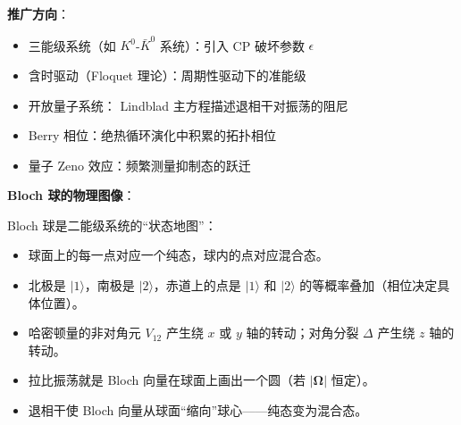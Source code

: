\begin{insightbox}[物理图像与模型关联]
\textbf{推广方向}：
\begin{itemize}[nosep]
    \item 三能级系统（如 $K^0$-$\bar{K}^0$ 系统）：引入 CP 破坏参数 $\epsilon$
    \item 含时驱动（Floquet 理论）：周期性驱动下的准能级
    \item 开放量子系统： Lindblad 主方程描述退相干对振荡的阻尼
    \item Berry 相位：绝热循环演化中积累的拓扑相位
    \item 量子 Zeno 效应：频繁测量抑制态的跃迁
\end{itemize}

\textbf{Bloch 球的物理图像}：

Bloch 球是二能级系统的``状态地图''：
\begin{itemize}[nosep]
    \item 球面上的每一点对应一个纯态，球内的点对应混合态。
    \item 北极是 $|1\rangle$，南极是 $|2\rangle$，赤道上的点是 $|1\rangle$ 和 $|2\rangle$ 的等概率叠加（相位决定具体位置）。
    \item 哈密顿量的非对角元 $V_{12}$ 产生绕 $x$ 或 $y$ 轴的转动；对角分裂 $\Delta$ 产生绕 $z$ 轴的转动。
    \item 拉比振荡就是 Bloch 向量在球面上画出一个圆（若 $|\boldsymbol{\Omega}|$ 恒定）。
    \item 退相干使 Bloch 向量从球面``缩向''球心——纯态变为混合态。
\end{itemize}
\end{insightbox}

